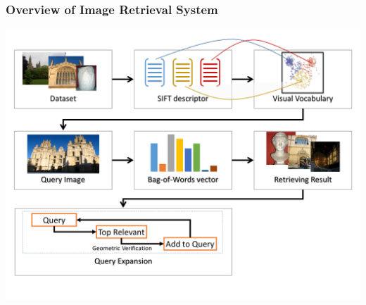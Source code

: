 \begin{frame}
	\frametitle{Overview of Image Retrieval System}
	\begin{center}
	\includegraphics[width=\textwidth]{images/process.png}
	\end{center}
\end{frame}
